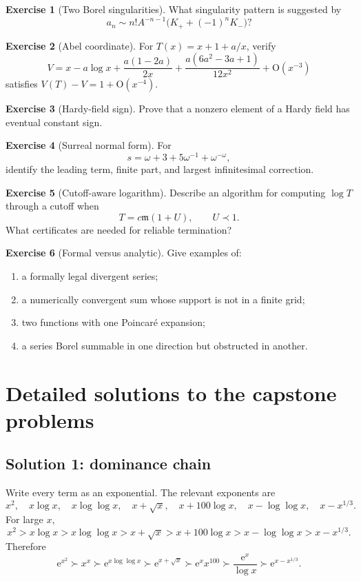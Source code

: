 \documentclass[11pt,oneside,openany]{book}
\newcommand{\e}{\mathrm{e}}
\newcommand{\bigO}{\mathrm{O}}
\newcommand{\mon}{\mathfrak{m}}
\theoremstyle{plain}
\theoremstyle{definition}
\newtheorem{exercise}{Exercise}[chapter]
\theoremstyle{remark}
\begin{document}
\begin{exercise}[Two Borel singularities]
What singularity pattern is suggested by
\[
  a_n\sim n!A^{-n-1}\bigl(K_++(-1)^nK_-\bigr)?
\]
\end{exercise}

\begin{exercise}[Abel coordinate]
For $T(x)=x+1+a/x$, verify
\[
  V=x-a\log x+\frac{a(1-2a)}{2x}
  +\frac{a(6a^2-3a+1)}{12x^2}+\bigO(x^{-3})
\]
satisfies $V(T)-V=1+\bigO(x^{-4})$.
\end{exercise}

\begin{exercise}[Hardy-field sign]
Prove that a nonzero element of a Hardy field has eventual constant sign.
\end{exercise}

\begin{exercise}[Surreal normal form]
For
\[
  s=\omega+3+5\omega^{-1}+\omega^{-\omega},
\]
identify the leading term, finite part, and largest infinitesimal correction.
\end{exercise}

\begin{exercise}[Cutoff-aware logarithm]
Describe an algorithm for computing $\log T$ through a cutoff when
\[
  T=c\mon(1+U),
  \qquad U\prec1.
\]
What certificates are needed for reliable termination?
\end{exercise}

\begin{exercise}[Formal versus analytic]
Give examples of:
\begin{enumerate}
  \item a formally legal divergent series;
  \item a numerically convergent sum whose support is not in a finite grid;
  \item two functions with one Poincaré expansion;
  \item a series Borel summable in one direction but obstructed in another.
\end{enumerate}
\end{exercise}


\chapter{Detailed solutions to the capstone problems}
\label{app:solutions}

\section*{Solution 1: dominance chain}
Write every term as an exponential. The relevant exponents are
\[
  x^2,
  \quad x\log x,
  \quad x\log\log x,
  \quad x+\sqrt{x},
  \quad x+100\log x,
  \quad x-\log\log x,
  \quad x-x^{1/3}.
\]
For large $x$,
\[
  x^2>x\log x>x\log\log x>x+\sqrt{x}
  >x+100\log x>x-\log\log x>x-x^{1/3}.
\]
Therefore
\[
\boxed{
\e^{x^2}\succ x^x\succ\e^{x\log\log x}
\succ\e^{x+\sqrt{x}}
\succ\e^xx^{100}
\succ\frac{\e^x}{\log x}
\succ\e^{x-x^{1/3}}.}
\]
\end{document}
